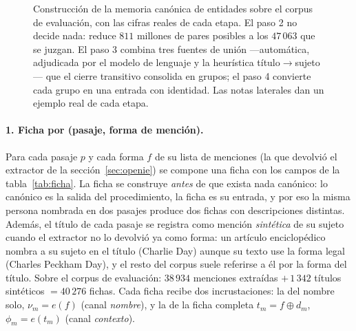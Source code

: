 \documentclass[11pt,a4paper]{article}
\begin{document}
\begin{figure}[p]
\caption{Construcción de la memoria canónica de entidades sobre el corpus de
evaluación, con las cifras reales de cada etapa. El paso 2 no decide nada:
reduce $811$ millones de pares posibles a los $47\,063$ que se juzgan. El
paso 3 combina tres fuentes de unión ---automática, adjudicada por el modelo
de lenguaje y la heurística título$\to$sujeto--- que el cierre transitivo
consolida en grupos; el paso 4 convierte cada grupo en una entrada con
identidad. Las notas laterales dan un ejemplo real de cada etapa.}
\label{fig:diccionario}
\end{figure}

\paragraph{1. Ficha por (pasaje, forma de mención).}
Para cada pasaje $p$ y cada forma $f$ de su lista de menciones (la que
devolvió el extractor de la sección~\ref{sec:openie}) se compone una ficha
con los campos de la tabla~\ref{tab:ficha}. La ficha se construye
\emph{antes} de que exista nada canónico: lo canónico es la salida del
procedimiento, la ficha es su entrada, y por eso la misma persona nombrada
en dos pasajes produce dos fichas con descripciones distintas. Además, el
título de cada pasaje se registra como mención \emph{sintética} de su
sujeto cuando el extractor no lo devolvió ya como forma: un artículo
enciclopédico nombra a su sujeto en el título (\guillemotleft{}Charlie Day\guillemotright{}) aunque su
texto use la forma legal (\guillemotleft{}Charles Peckham Day\guillemotright{}), y el resto del corpus
suele referirse a él por la forma del título. Sobre el corpus de evaluación:
$38\,934$ menciones extraídas $+\,1\,342$ títulos sintéticos $= 40\,276$
fichas. Cada ficha recibe dos incrustaciones: la del nombre solo,
$\nu_m = e(f)$ (canal \emph{nombre}), y la de la ficha completa
$t_m = f \oplus d_m$, $\phi_m = e(t_m)$ (canal \emph{contexto}).
\end{document}
